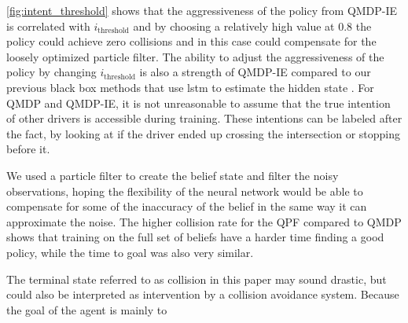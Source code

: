 	\ref{fig:intent_threshold} shows that the aggressiveness of the policy from QMDP-IE is correlated with $i_\text{threshold}$ and by choosing a relatively high value at $0.8$ the policy could achieve zero collisions and in this case could compensate for the loosely optimized particle filter. The ability to adjust the aggressiveness of the policy by changing $i_\text{threshold}$ is also a strength of QMDP-IE compared to our previous black box methods that use \gls{lstm} to estimate the hidden state \cite{Tram2018}. For QMDP and QMDP-IE, it is not unreasonable to assume that the true intention of other drivers is accessible during training. These intentions can be labeled after the fact, by looking at if the driver ended up crossing the intersection or stopping before it. 
	
	We used a particle filter to create the belief state and filter the noisy observations, hoping the flexibility of the neural network would be able to compensate for some of the inaccuracy of the belief in the same way it can approximate the noise. The higher collision rate for the QPF compared to QMDP shows that training on the full set of beliefs have a harder time finding a good policy, while the time to goal was also very similar. 
	
	The terminal state referred to as collision in this paper may sound drastic, but could also be interpreted as intervention by a collision avoidance system. Because the goal of the agent is mainly to  

